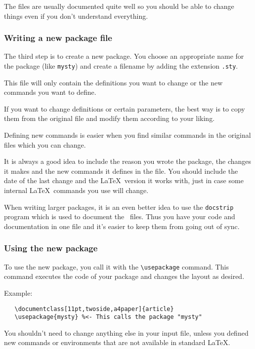 \documentclass[twoside,a4paper]{refart}
\begin{document}
The files are usually documented quite well so you should be able to 
change things even if you don't understand everything.


\subsubsection{Writing a new package file}

The third step is to create a new package. You choose an appropriate 
name for the package (like \texttt{mysty}) and create a filename by 
adding the extension \texttt{.sty}.

This file will only contain the definitions you want to change or the 
new commands you want to define.

If you want to change definitions or certain parameters, the best way 
is to copy them from the original file and modify them according to 
your liking.

Defining new commands is easier when you find similar commands in the 
original files which you can change.

It is always a good idea to include the reason you wrote the package, 
the changes it makes and the new commands it defines in the file. You 
should include the date of the last change and the \LaTeX\ version it 
works with, just in case some internal \LaTeX\ commands you use will change.

When writing larger packages, it is an even better idea to use the 
\texttt{docstrip} program which is used to document the \LaTeXe\ files.  Thus 
you have your code and documentation in one file and it's easier to 
keep them from going out of sync.

\subsubsection{Using the new package}

To use the new package, you call it with the \verb|\usepackage| command. 
This command executes the code of your package and changes the layout 
as desired.

Example:

\begin{verbatim}
   \documentclass[11pt,twoside,a4paper]{article}
   \usepackage{mysty} %<- This calls the package "mysty"
\end{verbatim}

You shouldn't need to change anything else in your input file, unless 
you defined new commands or environments that are not available in 
standard \LaTeX.
\end{document}
